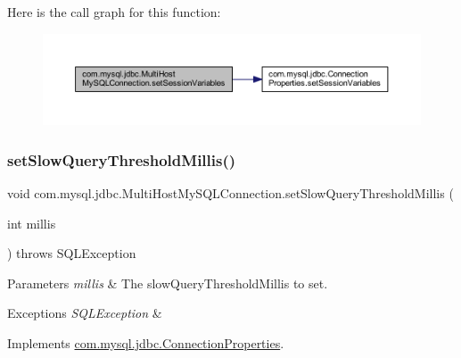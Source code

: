 Here is the call graph for this function\+:
\nopagebreak
\begin{figure}[H]
\begin{center}
\leavevmode
\includegraphics[width=350pt]{classcom_1_1mysql_1_1jdbc_1_1_multi_host_my_s_q_l_connection_ad1406aa3ec3a0b76716744c9be734d7f_cgraph}
\end{center}
\end{figure}
\mbox{\label{classcom_1_1mysql_1_1jdbc_1_1_multi_host_my_s_q_l_connection_a0b2593b4f94be127319ff6d487f5edcc}} 
\subsubsection{\texorpdfstring{set\+Slow\+Query\+Threshold\+Millis()}{setSlowQueryThresholdMillis()}}
{\footnotesize\ttfamily void com.\+mysql.\+jdbc.\+Multi\+Host\+My\+S\+Q\+L\+Connection.\+set\+Slow\+Query\+Threshold\+Millis (\begin{DoxyParamCaption}\item[{int}]{millis }\end{DoxyParamCaption}) throws S\+Q\+L\+Exception}


\begin{DoxyParams}{Parameters}
{\em millis} & The slow\+Query\+Threshold\+Millis to set. \\
\hline
\end{DoxyParams}

\begin{DoxyExceptions}{Exceptions}
{\em S\+Q\+L\+Exception} & \\
\hline
\end{DoxyExceptions}


Implements \mbox{\hyperlink{interfacecom_1_1mysql_1_1jdbc_1_1_connection_properties_a3cfee5c659ab60c5fdb925490d81ad0f}{com.\+mysql.\+jdbc.\+Connection\+Properties}}.

